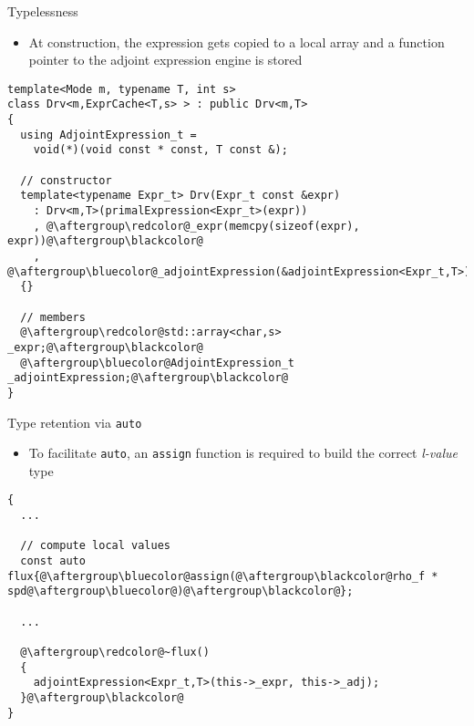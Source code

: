 \documentclass[xcolor=dvipsnames]{beamer}
\begin{document}
\begin{frame}[fragile]{Typelessness}
\begin{itemize}
\item At construction, the {\color{red}expression} gets copied to a local array and a {\color{blue}function pointer} to the adjoint expression engine is stored \vspace{2mm}
\end{itemize}
\begin{lstlisting}
template<Mode m, typename T, int s>
class Drv<m,ExprCache<T,s> > : public Drv<m,T>
{
  using AdjointExpression_t =
    void(*)(void const * const, T const &);

  // constructor
  template<typename Expr_t> Drv(Expr_t const &expr)
    : Drv<m,T>(primalExpression<Expr_t>(expr))
    , @\aftergroup\redcolor@_expr(memcpy(sizeof(expr), expr))@\aftergroup\blackcolor@
    , @\aftergroup\bluecolor@_adjointExpression(&adjointExpression<Expr_t,T>)@\aftergroup\blackcolor@
  {}

  // members
  @\aftergroup\redcolor@std::array<char,s> _expr;@\aftergroup\blackcolor@
  @\aftergroup\bluecolor@AdjointExpression_t _adjointExpression;@\aftergroup\blackcolor@
}
\end{lstlisting}
\end{frame}


\begin{frame}[fragile]{Type retention via \texttt{auto}}
\begin{itemize}
\item To facilitate \texttt{auto}, an {\color{blue}\texttt{assign}} function is required to build the correct \emph{l-value} type \vspace{2mm}
\end{itemize}
\begin{lstlisting}
{
  ...

  // compute local values
  const auto flux{@\aftergroup\bluecolor@assign(@\aftergroup\blackcolor@rho_f * spd@\aftergroup\bluecolor@)@\aftergroup\blackcolor@};

  ...

  @\aftergroup\redcolor@~flux()
  {
    adjointExpression<Expr_t,T>(this->_expr, this->_adj);
  }@\aftergroup\blackcolor@
}
\end{lstlisting}
\end{frame}
\end{document}
